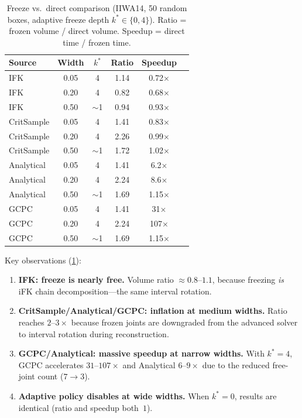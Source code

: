 \documentclass[journal]{IEEEtran}
\begin{document}
\begin{table}[t]
\centering
\caption{Freeze vs.\ direct comparison (IIWA14, 50 random boxes,
adaptive freeze depth $k^*{\in}\{0,4\}$).
Ratio = frozen volume / direct volume.
Speedup = direct time / frozen time.}
\label{tab:freeze}
\setlength{\tabcolsep}{3pt}
\small
\begin{tabular}{@{}lccccc@{}}
\toprule
Source & Width & $k^*$ & Ratio & \!Speedup\! \\
\midrule
IFK         & 0.05 & 4 & 1.14 & 0.72$\times$ \\
IFK         & 0.20 & 4 & 0.82 & 0.68$\times$ \\
IFK         & 0.50 & $\sim$1 & 0.94 & 0.93$\times$ \\
\midrule
CritSample  & 0.05 & 4 & 1.41 & 0.83$\times$ \\
CritSample  & 0.20 & 4 & 2.26 & 0.99$\times$ \\
CritSample  & 0.50 & $\sim$1 & 1.72 & 1.02$\times$ \\
\midrule
Analytical  & 0.05 & 4 & 1.41 & 6.2$\times$ \\
Analytical  & 0.20 & 4 & 2.24 & 8.6$\times$ \\
Analytical  & 0.50 & $\sim$1 & 1.69 & 1.15$\times$ \\
\midrule
GCPC        & 0.05 & 4 & 1.41 & 31$\times$ \\
GCPC        & 0.20 & 4 & 2.24 & 107$\times$ \\
GCPC        & 0.50 & $\sim$1 & 1.69 & 1.15$\times$ \\
\bottomrule
\end{tabular}
\end{table}

Key observations (\cref{tab:freeze}):
\begin{enumerate}
  \item \textbf{IFK: freeze is nearly free.}
    Volume ratio $\approx 0.8$--$1.1$, because freezing \emph{is}
    iFK chain decomposition---the same interval rotation.
  \item \textbf{CritSample/Analytical/GCPC: inflation at medium widths.}
    Ratio reaches $2$--$3{\times}$ because frozen joints are
    downgraded from the advanced solver to interval rotation
    during reconstruction.
  \item \textbf{GCPC/Analytical: massive speedup at narrow widths.}
    With $k^*{=}4$, GCPC accelerates $31$--$107{\times}$
    and Analytical $6$--$9{\times}$ due to the reduced
    free-joint count ($7 \to 3$).
  \item \textbf{Adaptive policy disables at wide widths.}
    When $k^*{=}0$, results are identical (ratio and speedup both~$1$).
\end{enumerate}
\end{document}
